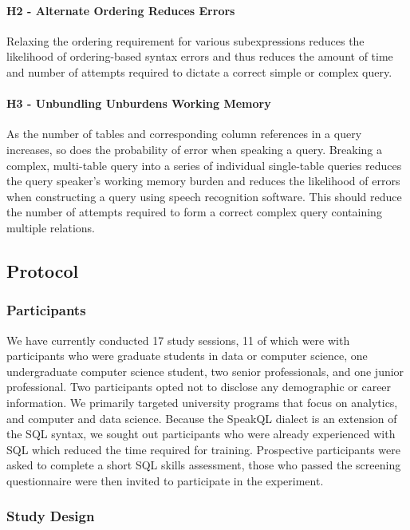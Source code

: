\paragraph{H2 - Alternate Ordering Reduces Errors} Relaxing the ordering requirement for various subexpressions reduces the likelihood of ordering-based syntax errors and thus reduces the amount of time and number of attempts required to dictate a correct simple or complex query. 

\paragraph{H3 - Unbundling Unburdens Working Memory} As the number of tables and corresponding column references in a query increases, so does the probability of error when speaking a query. Breaking a complex, multi-table query into a series of individual single-table queries reduces the query speaker's working memory burden and reduces the likelihood of errors when constructing a query using speech recognition software. This should reduce the number of attempts required to form a correct complex query containing multiple relations.

\subsection{Protocol}

\subsubsection{Participants}

We have currently conducted 17 study sessions, 11 of which were with participants who were graduate students in data or computer science, one undergraduate computer science student, two senior professionals, and one junior professional. Two participants opted not to disclose any demographic or career information. We primarily targeted university programs that focus on analytics, and computer and data science. Because the SpeakQL dialect is an extension of the SQL syntax, we sought out participants who were already experienced with SQL which reduced the time required for training. Prospective participants were asked to complete a short SQL skills assessment, those who passed the screening questionnaire were then invited to participate in the experiment.

\subsubsection{Study Design}

